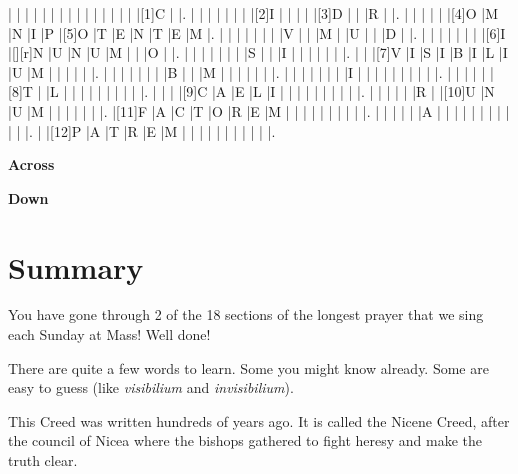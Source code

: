 \documentclass[12pt,a4paper]{article}
\begin{document}
\begin{Puzzle}{17}{15}
|{} |{} |{} |{} |{} |{} |{} |{} |{} |{} |{} |{} |{} |{} |{} |[1]C |{} |.
|{} |{} |{} |{} |{} |{} |{} |[2]I |{} |{} |{} |{} |[3]D |{} |{} |R |{} |.
|{} |{} |{} |{} |{} |[4]O |M |N |I |P |[5]O |T |E |N |T |E |M |.
|{} |{} |{} |{} |{} |{} |{} |V |{} |{} |M |{} |U |{} |{} |D |{} |.
|{} |{} |{} |{} |{} |{} |{} |[6]I |[][r]N |U |N |U |M |{} |{} |O |{} |.
|{} |{} |{} |{} |{} |{} |{} |S |{} |{} |I |{} |{} |{} |{} |{} |{} |.
|{} |{} |[7]V |I |S |I |B |I |L |I |U |M |{} |{} |{} |{} |{} |.
|{} |{} |{} |{} |{} |{} |{} |B |{} |{} |M |{} |{} |{} |{} |{} |{} |.
|{} |{} |{} |{} |{} |{} |{} |I |{} |{} |{} |{} |{} |{} |{} |{} |{} |.
|{} |{} |{} |{} |{} |[8]T |{} |L |{} |{} |{} |{} |{} |{} |{} |{} |{} |.
|{} |{} |{} |[9]C |A |E |L |I |{} |{} |{} |{} |{} |{} |{} |{} |{} |.
|{} |{} |{} |{} |{} |R |{} |[10]U |N |U |M |{} |{} |{} |{} |{} |{} |.
|[11]F |A |C |T |O |R |E |M |{} |{} |{} |{} |{} |{} |{} |{} |{} |.
|{} |{} |{} |{} |{} |A |{} |{} |{} |{} |{} |{} |{} |{} |{} |{} |{} |.
|{} |[12]P |A |T |R |E |M |{} |{} |{} |{} |{} |{} |{} |{} |{} |{} |.
\end{Puzzle}

\begin{PuzzleClues}{\textbf{Across}}
\end{PuzzleClues}%
\begin{PuzzleClues}{\textbf{Down}}
\end{PuzzleClues}

\newpage

\section{Summary}

You have gone through 2 of the 18 sections of the longest prayer that we sing each Sunday at Mass!  Well done!

There are quite a few words to learn.  Some you might know already.  Some are easy to guess (like \emph{visibilium} and \emph{invisibilium}).

This Creed was written hundreds of years ago.  It is called the Nicene Creed, after the council of Nicea where the bishops gathered to fight heresy and make the truth clear.
\end{document}
